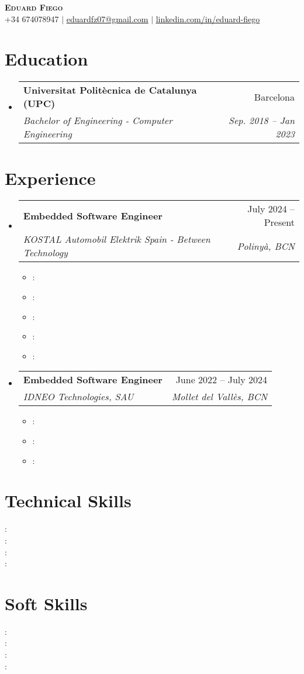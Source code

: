 \documentclass[letterpaper,11pt]{article}
\makeatletter
\newcommand{\resumeItem}[2]{
  \item\small{
    \textbf{#1}{: #2 \vspace{-2pt}}
}}
\newcommand{\resumeSubheading}[4]{
  \vspace{-2pt}\item
    \begin{tabular*}{0.97\textwidth}[t]{l@{\extracolsep{\fill}}r}
      \textbf{#1} & #2 \\
      \textit{\small#3} & \textit{\small #4} \\
    \end{tabular*}\vspace{-7pt}
}
\newcommand{\resumeSubHeadingListStart}{\begin{itemize}[leftmargin=0.15in, label={}]}
\newcommand{\resumeSubHeadingListEnd}{\end{itemize}}
\newcommand{\resumeItemListStart}{\begin{itemize}}
\newcommand{\resumeItemListEnd}{\end{itemize}\vspace{-5pt}}
\makeatother
\begin{document}

\begin{center}
    \textbf{\Huge \scshape Eduard Fiego} \\ \vspace{1pt}
    \small +34 674078947 $|$ \href{mailto:eduardfz07@gmail.com}{\underline{eduardfz07@gmail.com}} $|$
    \href{https://www.linkedin.com/in/eduard-fiego-737667237/}{\underline{linkedin.com/in/eduard-fiego}}
\end{center}


\section{Education}
  \resumeSubHeadingListStart
    \resumeSubheading
      {Universitat Politècnica de Catalunya (UPC)}{Barcelona}
      {Bachelor of Engineering - Computer Engineering}{Sep. 2018 -- Jan 2023}
  \resumeSubHeadingListEnd


\section{Experience}
  \resumeSubHeadingListStart

    \resumeSubheading
      {Embedded Software Engineer}{July 2024 -- Present}
      {KOSTAL Automobil Elektrik Spain - Between Technology}{Polinyà, BCN}
      \resumeItemListStart
        \resumeItem{}
        {}
        \resumeItem{}
        {}
        \resumeItem{}
        {}
        \resumeItem{}
        {}
        \resumeItem{}
        {}
      \resumeItemListEnd

    \resumeSubheading
      {Embedded Software Engineer}{June 2022 -- July 2024}
      {IDNEO Technologies, SAU}{Mollet del Vallès, BCN}
      \resumeItemListStart
        \resumeItem{}{}
        \resumeItem{}{}
        \resumeItem{}{}
      \resumeItemListEnd
  \resumeSubHeadingListEnd





%
\section{Technical Skills}
 \begin{itemize}[leftmargin=0.15in, label={}]
    \small{\item{
     \textbf{}{: } \\
     \textbf{}{: } \\
     \textbf{}{: } \\
     \textbf{}{: }
    }}
 \end{itemize}

\section{Soft Skills}
 \begin{itemize}[leftmargin=0.15in, label={}]
    \small{\item{
     \textbf{}{: } \\
     \textbf{}{: } \\
     \textbf{}{: } \\
     \textbf{}{: }
    }}
 \end{itemize}

\end{document}
